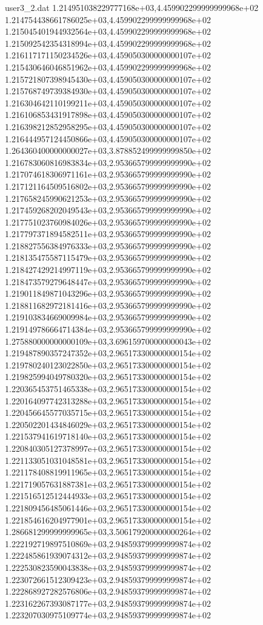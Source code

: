 \begin{filecontents}{user3_2.dat}
1.214951038229777168e+03,4.459902299999999968e+02
1.214754438661786025e+03,4.459902299999999968e+02
1.215045401944932564e+03,4.459902299999999968e+02
1.215092542354318994e+03,4.459902299999999968e+02
1.216117171150234526e+03,4.459050300000000107e+02
1.215430646046851962e+03,4.459902299999999968e+02
1.215721807398945430e+03,4.459050300000000107e+02
1.215768749739384930e+03,4.459050300000000107e+02
1.216304642110199211e+03,4.459050300000000107e+02
1.216106853431917898e+03,4.459050300000000107e+02
1.216398212852958295e+03,4.459050300000000107e+02
1.216444957124450866e+03,4.459050300000000107e+02
1.264360400000000027e+03,3.878852499999999850e+02
1.216783060816983834e+03,2.953665799999999990e+02
1.217074618306971161e+03,2.953665799999999990e+02
1.217121164509516802e+03,2.953665799999999990e+02
1.217658245990621253e+03,2.953665799999999990e+02
1.217459268202049543e+03,2.953665799999999990e+02
1.217751023760984026e+03,2.953665799999999990e+02
1.217797371894582511e+03,2.953665799999999990e+02
1.218827556384976333e+03,2.953665799999999990e+02
1.218135475587115479e+03,2.953665799999999990e+02
1.218427429214997119e+03,2.953665799999999990e+02
1.218473579279648447e+03,2.953665799999999990e+02
1.219011849871043296e+03,2.953665799999999990e+02
1.218811682972181416e+03,2.953665799999999990e+02
1.219103834669009984e+03,2.953665799999999990e+02
1.219149786664714384e+03,2.953665799999999990e+02
1.275880000000000109e+03,3.696159700000000043e+02
1.219487890357247352e+03,2.965173300000000154e+02
1.219780240123022850e+03,2.965173300000000154e+02
1.219825994049780320e+03,2.965173300000000154e+02
1.220365453751465338e+03,2.965173300000000154e+02
1.220164097742313288e+03,2.965173300000000154e+02
1.220456645577035715e+03,2.965173300000000154e+02
1.220502201434846029e+03,2.965173300000000154e+02
1.221537941619718140e+03,2.965173300000000154e+02
1.220840305127378997e+03,2.965173300000000154e+02
1.221133051031048581e+03,2.965173300000000154e+02
1.221178408819911965e+03,2.965173300000000154e+02
1.221719057631887381e+03,2.965173300000000154e+02
1.221516512512444933e+03,2.965173300000000154e+02
1.221809456485061446e+03,2.965173300000000154e+02
1.221854616204977901e+03,2.965173300000000154e+02
1.286681299999999965e+03,3.506179200000000264e+02
1.222192719897510869e+03,2.948593799999999874e+02
1.222485861939074312e+03,2.948593799999999874e+02
1.222530823590043838e+03,2.948593799999999874e+02
1.223072661512309423e+03,2.948593799999999874e+02
1.222868927282576806e+03,2.948593799999999874e+02
1.223162267393087177e+03,2.948593799999999874e+02
1.223207030975109774e+03,2.948593799999999874e+02

\end{filecontents}

